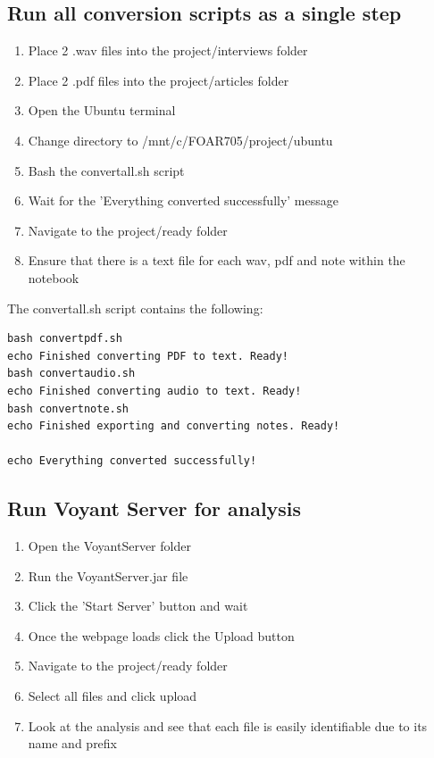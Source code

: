 \documentclass{article}
\begin{document}
\subsection{Run all conversion scripts as a single step}
\begin{enumerate}
    \item Place 2 .wav files into the project/interviews folder
    \item Place 2 .pdf files into the project/articles folder
    \item Open the Ubuntu terminal
    \item Change directory to /mnt/c/FOAR705/project/ubuntu
    \item Bash the convertall.sh script
    \item Wait for the 'Everything converted successfully' message
    \item Navigate to the project/ready folder
    \item Ensure that there is a text file for each wav, pdf and note within the notebook
\end{enumerate}
The convertall.sh script contains the following:
\begin{verbatim}
bash convertpdf.sh
echo Finished converting PDF to text. Ready!
bash convertaudio.sh
echo Finished converting audio to text. Ready!
bash convertnote.sh
echo Finished exporting and converting notes. Ready!

echo Everything converted successfully!

\end{verbatim}

\subsection{Run Voyant Server for analysis}
\begin{enumerate}
    \item Open the VoyantServer folder
    \item Run the VoyantServer.jar file
    \item Click the 'Start Server' button and wait
    \item Once the webpage loads click the Upload button
    \item Navigate to the project/ready folder
    \item Select all files and click upload
    \item Look at the analysis and see that each file is easily identifiable due to its name and prefix 
\end{enumerate}
\end{document}
